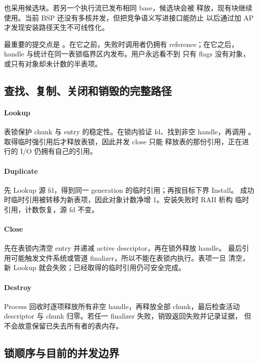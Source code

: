  也采用候选块。若另一个执行流已发布相同 base，候选块会被
释放，现有块继续使用。当前 BSP 还没有多核并发，但把竞争语义写进接口能防止
以后通过加 AP 才发现安装路径天生不可线性化。

最重要的提交点是 。在它之前，失败时调用者仍拥有
reference；在它之后，handle 与统计在同一表锁临界区内发布。用户永远看不到
只有 flags 没有对象，或只有对象却未计数的半表项。

\subsection{查找、复制、关闭和销毁的完整路径}

\paragraph{Lookup}

表锁保护 chunk 与 entry 的稳定性。在锁内验证 fd、找到非空 handle，再调用
。取得临时强引用后才释放表锁，因此并发 close 只能
释放表的那份引用，正在进行的 I/O 仍拥有自己的引用。

\paragraph{Duplicate}

先 Lookup 源 fd，得到同一 generation 的临时引用；再按目标下界 Install。
成功时临时引用被转移为新表项，因此对象计数净增 1。安装失败时 RAII 析构
临时引用，计数恢复，源 fd 不变。

\paragraph{Close}

先在表锁内清空 entry 并递减 active descriptor，再在锁外释放 handle。
最后引用可能触发文件系统或管道 finalizer，所以不能在表锁内执行。表项一旦
清空，新 Lookup 就会失败；已经取得的临时引用仍可安全完成。

\paragraph{Destroy}

Process 回收时逐项释放所有非空 handle，再释放全部 chunk，最后检查活动
descriptor 与 chunk 归零。若任一 finalizer 失败，销毁返回失败并记录证据，
但不会故意保留已失去所有者的表内存。

\subsection{锁顺序与目前的并发边界}

